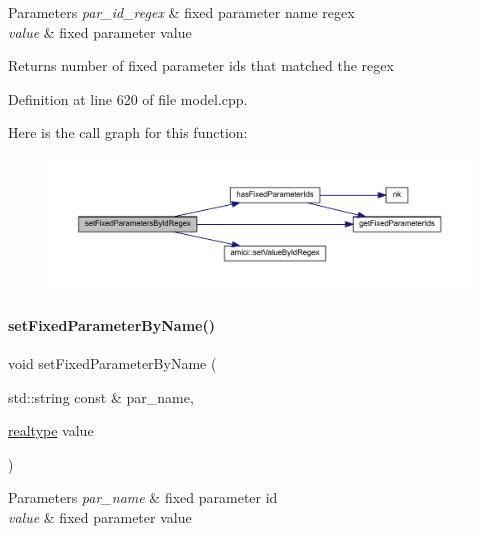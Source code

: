 \begin{DoxyParams}{Parameters}
{\em par\+\_\+id\+\_\+regex} & fixed parameter name regex \\
\hline
{\em value} & fixed parameter value \\
\hline
\end{DoxyParams}
\begin{DoxyReturn}{Returns}
number of fixed parameter ids that matched the regex 
\end{DoxyReturn}


Definition at line 620 of file model.\+cpp.

Here is the call graph for this function\+:
\nopagebreak
\begin{figure}[H]
\begin{center}
\leavevmode
\includegraphics[width=350pt]{classamici_1_1_model_acda9b9debfd3d6ac77e2d27a48bfb5d6_cgraph}
\end{center}
\end{figure}
\mbox{\label{classamici_1_1_model_af1225439bd6deceb98b224e75a960800}} 
\paragraph{\texorpdfstring{setFixedParameterByName()}{setFixedParameterByName()}}
{\footnotesize\ttfamily void set\+Fixed\+Parameter\+By\+Name (\begin{DoxyParamCaption}\item[{std\+::string const \&}]{par\+\_\+name,  }\item[{\mbox{\hyperlink{namespaceamici_a1bdce28051d6a53868f7ccbf5f2c14a3}{realtype}}}]{value }\end{DoxyParamCaption})}


\begin{DoxyParams}{Parameters}
{\em par\+\_\+name} & fixed parameter id \\
\hline
{\em value} & fixed parameter value \\
\hline
\end{DoxyParams}


